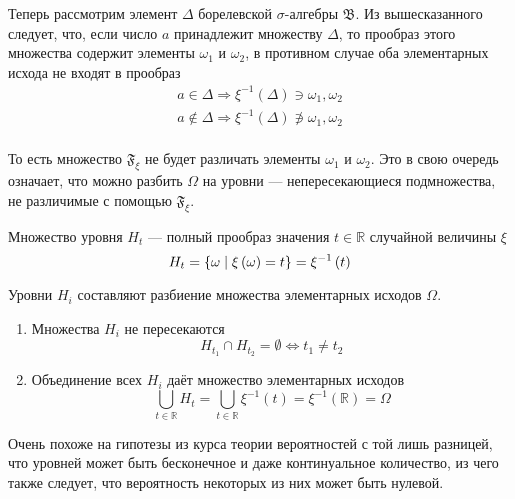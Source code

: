 Теперь рассмотрим элемент $\Delta$ борелевской $\sigma$-алгебры $\mathfrak{B}$.
Из вышесказанного следует, что,
если число $a$ принадлежит множеству $\Delta$, то прообраз этого множества
содержит элементы $\omega_1$ и $\omega_2$,
в противном случае оба элементарных исхода не входят в прообраз
\begin{align*}
  a \in \Delta
      \Rightarrow \xi^{-1}\left( \Delta \right) \ni \omega_1, \omega_2 \\
  a \notin \Delta
      \Rightarrow \xi^{-1}\left( \Delta \right) \not\ni \omega_1, \omega_2 \\
\end{align*}

То есть множество $\mathfrak{F}_\xi$ не будет различать
элементы $\omega_1$ и $\omega_2$.
Это в свою очередь означает, что можно разбить $\Omega$
на уровни --- непересекающиеся подмножества, не различимые с помощью
$\mathfrak{F}_{\xi}$.

\begin{definition}
  Множество уровня $H_t$ --- полный прообраз
  значения $t\in\mathbb{R}$ случайной величины $\xi$
  $$H_t
      = \left\{ \omega \;\middle|\; \xi\left( \omega \right) = t \right\}
      = \xi^{-1}\left( t \right)$$
\end{definition}

\begin{remark}
  Уровни $H_i$ составляют разбиение множества элементарных исходов $\Omega$.
  \begin{enumerate}
      \item Множества $H_i$ не пересекаются
        \begin{equation*}
          H_{t_1} \cap H_{t_2} = \emptyset \Leftrightarrow t_1 \neq t_2 
        \end{equation*}
      \item Объединение всех $H_i$ даёт множество элементарных исходов
      $$\bigcup_{t \in \mathbb{R}} H_t
          = \bigcup_{t \in \mathbb{R}} \xi^{-1}\left( t \right)
          = \xi^{-1}\left( \mathbb{R} \right)
          = \Omega$$
  \end{enumerate}
\end{remark}

Очень похоже на гипотезы из курса теории вероятностей с той лишь разницей,
что уровней может быть бесконечное и даже континуальное количество,
из чего также следует, что вероятность некоторых из них может быть нулевой.

